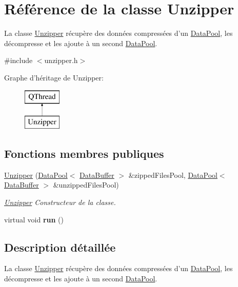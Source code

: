 \hypertarget{class_unzipper}{\section{Référence de la classe Unzipper}
\label{class_unzipper}
}


La classe \hyperlink{class_unzipper}{Unzipper} récupère des données compressées d'un \hyperlink{class_data_pool}{Data\+Pool}, les décompresse et les ajoute à un second \hyperlink{class_data_pool}{Data\+Pool}.  




{\ttfamily \#include $<$unzipper.\+h$>$}

Graphe d'héritage de Unzipper\+:\begin{figure}[H]
\begin{center}
\leavevmode
\includegraphics[height=2.000000cm]{class_unzipper}
\end{center}
\end{figure}
\subsection*{Fonctions membres publiques}
\begin{DoxyCompactItemize}
\item 
\hyperlink{class_unzipper_aace9b35fcb8e538366ed1ca6d674daec}{Unzipper} (\hyperlink{class_data_pool}{Data\+Pool}$<$ \hyperlink{class_data_buffer}{Data\+Buffer} $>$ \&zipped\+Files\+Pool, \hyperlink{class_data_pool}{Data\+Pool}$<$ \hyperlink{class_data_buffer}{Data\+Buffer} $>$ \&unzipped\+Files\+Pool)
\begin{DoxyCompactList}\small\item\em \hyperlink{class_unzipper}{Unzipper} Constructeur de la classe. \end{DoxyCompactList}\item 
\hypertarget{class_unzipper_a944444cb50d895056181adb856841def}{virtual void {\bfseries run} ()}\label{class_unzipper_a944444cb50d895056181adb856841def}

\end{DoxyCompactItemize}


\subsection{Description détaillée}
La classe \hyperlink{class_unzipper}{Unzipper} récupère des données compressées d'un \hyperlink{class_data_pool}{Data\+Pool}, les décompresse et les ajoute à un second \hyperlink{class_data_pool}{Data\+Pool}. 


